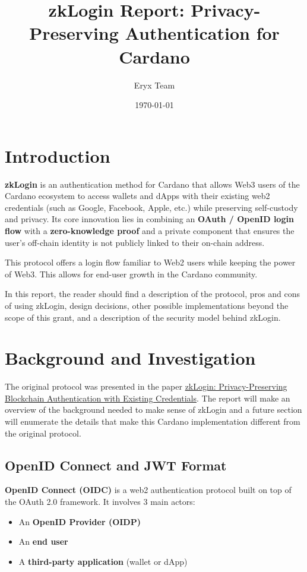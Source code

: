 \documentclass{article}
\title{zkLogin Report: Privacy-Preserving Authentication for Cardano}
\author{Eryx Team}
\date{\today}
\begin{document}
\maketitle
\newpage
\tableofcontents

\newpage

\section{Introduction}\label{sec:intro}

\textbf{zkLogin} is an authentication method for Cardano that allows Web3 users of the Cardano ecosystem to access wallets and dApps with their existing web2 credentials (such as Google, Facebook, Apple, etc.) while preserving self-custody and privacy. Its core innovation lies in combining an \textbf{OAuth / OpenID login flow} with a \textbf{zero-knowledge proof} and a private component that ensures the user's off-chain identity is not publicly linked to their on-chain address.

This protocol offers a login flow familiar to Web2 users while keeping the power of Web3. This allows for end-user growth in the Cardano community.

In this report, the reader should find a description of the protocol, pros and cons of using zkLogin, design decisions, other possible implementations beyond the scope of this grant, and a description of the security model behind zkLogin.

\section{Background and Investigation}

The original protocol was presented in the paper \href{https://dl.acm.org/doi/abs/10.1145/3658644.3690356}{zkLogin: Privacy-Preserving Blockchain Authentication with Existing Credentials}.
The report will make an overview of the background needed to make sense of zkLogin and a future section will enumerate the details that make this Cardano implementation different from the original protocol.

\subsection{OpenID Connect and JWT Format}

\textbf{OpenID Connect (OIDC)} is a web2 authentication protocol built on top of the OAuth 2.0 framework. It involves 3 main actors:
\begin{itemize}
    \item An \textbf{OpenID Provider (OIDP)}
    \item An \textbf{end user}
    \item A \textbf{third-party application} (wallet or dApp)
\end{itemize}
\end{document}
